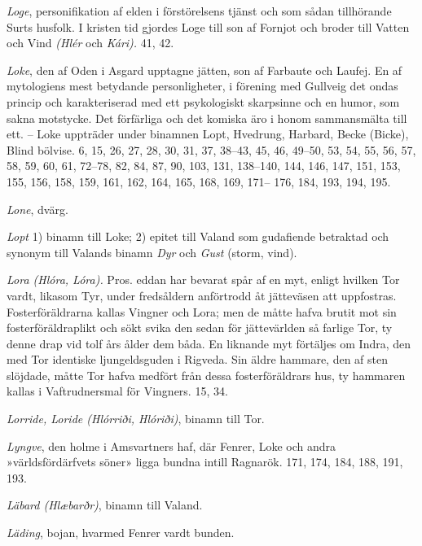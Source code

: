 \emph{Loge}, personifikation af elden i förstörelsens tjänst och som
sådan tillhörande Surts husfolk. I kristen tid gjordes Loge till son af
Fornjot och broder till Vatten och Vind \emph{(Hlér} och \emph{Kári).}
41, 42.

\emph{Loke}, den af Oden i Asgard upptagne jätten, son af Farbaute och
Laufej. En af mytologiens mest betydande personligheter, i förening med
Gullveig det ondas princip och karakteriserad med ett psykologiskt
skarpsinne och en humor, som sakna motstycke. Det förfärliga och det
komiska äro i honom sammansmälta till ett. -- Loke uppträder under
binamnen Lopt, Hvedrung, Harbard, Becke (Bicke), Blind bölvise. 6, 15,
26, 27, 28, 30, 31, 37, 38--43, 45, 46, 49--50, 53, 54, 55, 56, 57, 58,
59, 60, 61, 72--78, 82, 84, 87, 90, 103, 131, 138--140, 144, 146, 147,
151, 153, 155, 156, 158, 159, 161, 162, 164, 165, 168, 169, 171-- 176,
184, 193, 194, 195.

\emph{Lone}, dvärg.

\emph{Lopt} 1) binamn till Loke; 2) epitet till Valand som gudafiende
betraktad och synonym till Valands binamn \emph{Dyr} och \emph{Gust}
(storm, vind).

\emph{Lora (Hlóra, Lóra).} Pros. eddan har bevarat spår af en myt,
enligt hvilken Tor vardt, likasom Tyr, under fredsåldern anförtrodd åt
jätteväsen att uppfostras. Fosterföräldrarna kallas Vingner och Lora;
men de måtte hafva brutit mot sin fosterföräldraplikt och sökt svika den
sedan för jättevärlden så farlige Tor, ty denne drap vid tolf års ålder
dem båda. En liknande myt förtäljes om Indra, den med Tor identiske
ljungeldsguden i Rigveda. Sin äldre hammare, den af sten slöjdade, måtte
Tor hafva medfört från dessa fosterföräldrars hus, ty hammaren kallas i
Vaftrudnersmal för Vingners. 15, 34.

\emph{Lorride, Loride (Hlórriði, Hlóriði)}, binamn till Tor.

\emph{Lyngve}, den holme i Amsvartners haf, där Fenrer, Loke och andra
»världsfördärfvets söner» ligga bundna intill Ragnarök. 171, 174, 184,
188, 191, 193.

\emph{Läbard (Hlæbarðr)}, binamn till Valand.

\protect\hypertarget{lb1625905.xhtmlux5cux23start231}{}{}\protect\hypertarget{lb1625905.xhtmlux5cux23start231-a}{}{}\protect\hypertarget{lb1625905.xhtmlux5cux23start231-b}{}{}\protect\hypertarget{lb1625905.xhtmlux5cux23start231-c}{}{}\protect\hypertarget{lb1625905.xhtmlux5cux23start231-d}{}{}

\emph{Läding}, bojan, hvarmed Fenrer vardt bunden.


